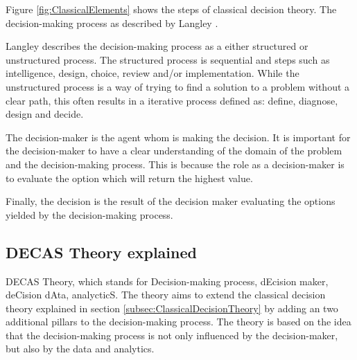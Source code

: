 Figure \ref{fig:ClassicalElements} shows the steps of classical decision theory. The decision-making process as described
by Langley \cite{Langley1995OpeningStool}. 

Langley describes the decision-making process as a either structured or unstructured process.
The structured process is sequential and steps such as intelligence, design, choice, review and/or implementation.
While the unstructured process is a way of trying to find a solution to a problem without a clear path, this
often results in a iterative process defined as: define, diagnose, design and decide.

The decision-maker is the agent whom is making the decision. It is important
for the decision-maker to have a clear understanding of the domain 
of the problem and the decision-making process. This is because the role as 
a decision-maker is to evaluate the option which will return the highest value.

Finally, the decision is the result of the decision maker evaluating the 
options yielded by the decision-making process. 

\subsection{DECAS Theory explained}\label{sec:DECASTheory}

DECAS Theory, which stands for Decision-making process, dEcision maker, deCision dAta, analycticS. 
The theory aims to extend the classical decision theory explained in section
\ref{subsec:ClassicalDecisionTheory} by adding an two additional pillars to the 
decision-making process. The theory is based on the idea that the decision-making process
is not only influenced by the decision-maker, but also by the data and analytics.

